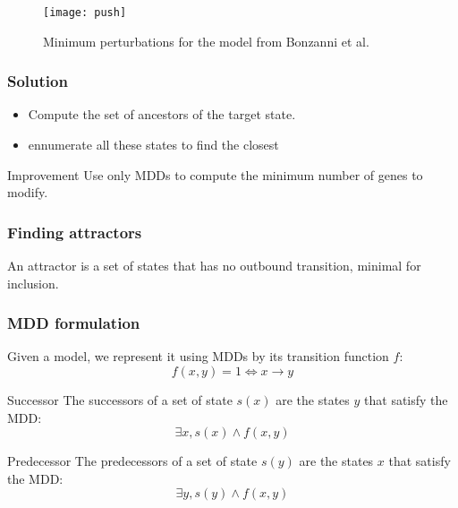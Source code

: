 \documentclass{beamer}
\begin{document}
\begin{frame}
\begin{figure}
\texttt{[image: push]}
\caption{Minimum perturbations for the model from Bonzanni et al.}
\end{figure}
\end{frame}

\begin{frame}
\frametitle{Solution}
\begin{itemize}
\item Compute the set of ancestors of the target state.

\bigskip
\item ennumerate all these states to find the closest
\end{itemize}

\bigskip
{}
\begin{block}{Improvement}
Use only MDDs to compute the minimum number of genes to modify.
\end{block}
\end{frame}


\begin{frame}
	\frametitle{Finding attractors}
	\begin{definition}
	An attractor is a set of states that has no outbound transition, minimal for inclusion.
	\end{definition}
\end{frame}

\begin{frame}
\frametitle{MDD formulation}
\begin{block}{}
Given a model, we represent it using MDDs by its transition function $f$:
$$ f(x,y) =1 \Leftrightarrow x \rightarrow y$$
\end{block}

\begin{block}{Successor}
The successors of a set of state $s(x)$ are the states $y$ that satisfy the MDD:
$$ \exists x, s(x) \wedge f(x,y)$$
\end{block}

\begin{block}{Predecessor}
The predecessors of a set of state $s(y)$ are the states $x$ that satisfy the MDD:
$$ \exists y, s(y) \wedge f(x,y)$$
\end{block}
\end{frame}
\end{document}
